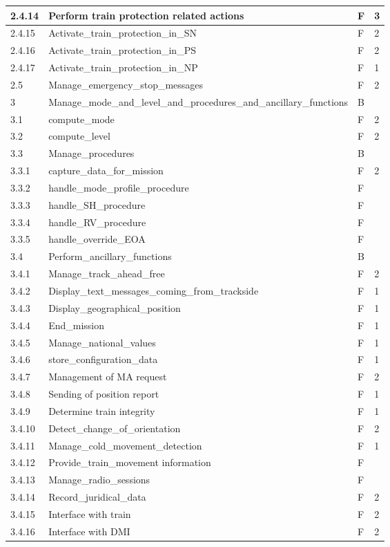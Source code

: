 \documentclass{template/openetcs_article}
\begin{document}
\begin{center}
\begin{longtable}{|m{1.5cm}|m{9cm}|m{3cm}|m{2cm}|}
2.4.14 & Perform train protection related actions & F & 3\\\hline
2.4.15 & Activate\_train\_protection\_in\_SN & F & 2\\\hline
2.4.16 & Activate\_train\_protection\_in\_PS & F & 2\\\hline
2.4.17 & Activate\_train\_protection\_in\_NP & F & 1\\\hline
2.5 & Manage\_emergency\_stop\_messages & F & 2\\\hline
\rowcolor{orange}
3 & Manage\_mode\_and\_level\_and\_procedures\_and\_ancillary\_functions & B & \\\hline
3.1 & compute\_mode & F & 2\\\hline
3.2 & compute\_level & F & 2\\\hline
\rowcolor{orange}
3.3 & Manage\_procedures & B & \\\hline
3.3.1 & capture\_data\_for\_mission & F & 2\\\hline
3.3.2 & handle\_mode\_profile\_procedure & F & \\\hline
3.3.3 & handle\_SH\_procedure & F & \\\hline
3.3.4 & handle\_RV\_procedure & F & \\\hline
3.3.5 & handle\_override\_EOA & F & \\\hline
\rowcolor{orange}
3.4 & Perform\_ancillary\_functions & B & \\\hline
3.4.1 & Manage\_track\_ahead\_free & F & 2\\\hline
3.4.2 & Display\_text\_messages\_coming\_from\_trackside & F & 1\\\hline
3.4.3 & Display\_geographical\_position & F & 1\\\hline
3.4.4 & End\_mission & F & 1\\\hline
3.4.5 & Manage\_national\_values & F & 1\\\hline
3.4.6 & store\_configuration\_data & F & 1\\\hline
3.4.7 & Management of MA request & F & 2\\\hline
3.4.8 & Sending of position report & F & 1\\\hline
3.4.9 & Determine train integrity & F & 1\\\hline
3.4.10 & Detect\_change\_of\_orientation & F & 2\\\hline
3.4.11 & Manage\_cold\_movement\_detection & F & 1\\\hline
3.4.12 & Provide\_train\_movement information & F & \\\hline
3.4.13 & Manage\_radio\_sessions & F & \\\hline
3.4.14 & Record\_juridical\_data & F & 2\\\hline
3.4.15 & Interface with train & F & 2\\\hline
3.4.16 & Interface with DMI & F & 2\\\hline
\end{longtable}
\end{center}
\end{document}
